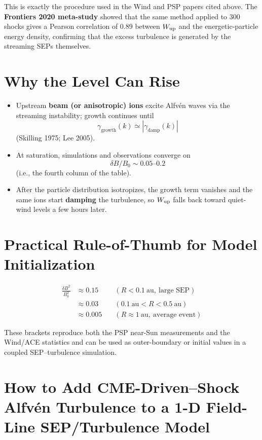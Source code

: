 \noindent
This is exactly the procedure used in the Wind and PSP papers cited above. The \textbf{Frontiers 2020 meta-study} showed that the same method applied to 300 shocks gives a Pearson correlation of 0.89 between $W_{\rm up}$ and the energetic-particle energy density, confirming that the excess turbulence is generated by the streaming SEPs themselves.

\section*{Why the Level Can Rise}

\begin{itemize}
\item Upstream \textbf{beam (or anisotropic) ions} excite Alfvén waves via the streaming instability; growth continues until
\[
\gamma_{\text{growth}}(k) \simeq |\gamma_{\text{damp}}(k)|
\]
(Skilling 1975; Lee 2005).
\item At saturation, simulations and observations converge on
\[
\delta B / B_{0} \sim 0.05\text{--}0.2
\]
(i.e., the fourth column of the table).
\item After the particle distribution isotropizes, the growth term vanishes and the same ions start \textbf{damping} the turbulence, so $W_{\rm up}$ falls back toward quiet-wind levels a few hours later.
\end{itemize}

\section*{Practical Rule-of-Thumb for Model Initialization}

\[
\begin{aligned}
\frac{\delta B^{2}}{B_0^{2}} &\approx 0.15 \quad & (R < 0.1\ \text{au},\ \text{large SEP}) \\
                             &\approx 0.03 \quad & (0.1\ \text{au} < R < 0.5\ \text{au}) \\
                             &\approx 0.005 \quad & (R \approx 1\ \text{au},\ \text{average event})
\end{aligned}
\]

\noindent
These brackets reproduce both the PSP near-Sun measurements and the Wind/ACE statistics and can be used as outer-boundary or initial values in a coupled SEP–turbulence simulation.


\section*{How to Add \textbf{CME-Driven–Shock Alfvén Turbulence} to a 1-D Field-Line SEP/Turbulence Model}

